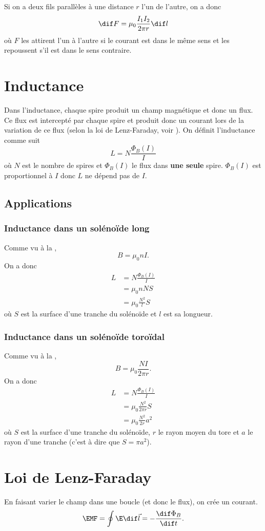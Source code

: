 Si on a deux fils parallèles à une distance $r$ l'un de l'autre, on a donc
\[ \dif F = \mu_0\frac{I_1I_2}{2\pi r}\dif l \]
où $F$ les attirent l'un à l'autre si le courant est
dans le même sens et les repoussent s'il est dans le sens contraire.

\section{Inductance}
Dans l'inductance, chaque spire produit un champ magnétique et donc un flux.
Ce flux est intercepté par chaque spire et produit donc un courant
lors de la variation de ce flux
(selon la loi de Lenz-Faraday, voir ).
On définit l'inductance comme suit
\[ L = N\frac{\Phi_B(I)}{I} \]
où $N$ est le nombre de spires et $\Phi_B(I)$
le flux dans \textbf{une seule} spire.
$\Phi_B(I)$ est proportionnel à $I$ donc $L$ ne dépend pas de $I$.

\subsection{Applications}
\subsubsection{Inductance dans un solénoïde long}
Comme vu à la ,
\[ B = \mu_0nI. \]
On a donc
\begin{align*}
  L &= N\frac{\Phi_B(I)}{I}\\
  &= \mu_0 nNS\\
  &= \mu_0 \frac{N^2}{l}S
\end{align*}
où $S$ est la surface d'une tranche du solénoïde et $l$ est sa longueur.

\subsubsection{Inductance dans un solénoïde toroïdal}
Comme vu à la ,
\[ B = \mu_0\frac{NI}{2\pi r}. \]
On a donc
\begin{align*}
  L &= N\frac{\Phi_B(I)}{I}\\
  &= \mu_0 \frac{N^2}{2\pi r}S\\
  &= \mu_0 \frac{N^2}{2r}a^2
\end{align*}
où $S$ est la surface d'une tranche du solénoïde,
$r$ le rayon moyen du tore et $a$
le rayon d'une tranche (c'est à dire que $S = \pi a^2$).

\section{Loi de Lenz-Faraday}
\label{sec:faraday}
En faisant varier le champ dans une boucle (et donc le flux),
on crée un courant.
\[ \EMF = \oint \E \dif \vec l = -\frac{\dif \Phi_B}{\dif t}. \]
